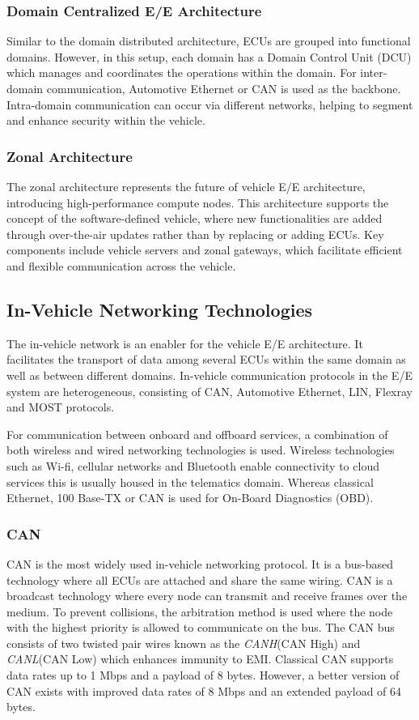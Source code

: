 \documentclass{report}
\begin{document}
\subsubsection{Domain Centralized E/E Architecture}
Similar to the domain distributed architecture, ECUs are grouped into functional domains. However, in this setup, each domain has a Domain Control Unit (DCU) which manages and coordinates the operations within the domain. For inter-domain communication, Automotive Ethernet or CAN is used as the backbone. Intra-domain communication can occur via different networks, helping to segment and enhance security within the vehicle.

\subsubsection{Zonal Architecture}
The zonal architecture represents the future of vehicle E/E architecture, introducing high-performance compute nodes. This architecture supports the concept of the software-defined vehicle, where new functionalities are added through over-the-air updates rather than by replacing or adding ECUs. Key components include vehicle servers and zonal gateways, which facilitate efficient and flexible communication across the vehicle.

\subsection{In-Vehicle Networking Technologies}
The in-vehicle network is an enabler for the vehicle E/E architecture. It facilitates the transport of data among several ECUs within the same domain as well as between different domains. In-vehicle communication protocols in the E/E system are heterogeneous, consisting of CAN, Automotive Ethernet, LIN, Flexray and MOST protocols. 

For communication between onboard and offboard services, a combination of both wireless and wired networking technologies is used. Wireless technologies such as Wi-fi, cellular networks and Bluetooth enable connectivity to cloud services  this is usually housed in the telematics domain. Whereas classical Ethernet, 100 Base-TX or CAN is used for On-Board Diagnostics (OBD).

\subsubsection{CAN}
CAN is the most widely used in-vehicle networking protocol. It is a bus-based technology where all ECUs are attached and share the same wiring. CAN is a broadcast technology where every node can transmit and receive frames over the medium. To prevent collisions, the arbitration method is used where the node with the highest priority is allowed to communicate on the bus. The CAN bus consists of two twisted pair wires known as the \emph{CANH}(CAN High) and \emph{CANL}(CAN Low)  which enhances immunity to EMI. Classical CAN supports data rates up to 1 Mbps and a payload of 8 bytes. However, a better version of CAN exists with improved data rates of 8 Mbps and an extended payload of 64 bytes.
\end{document}
